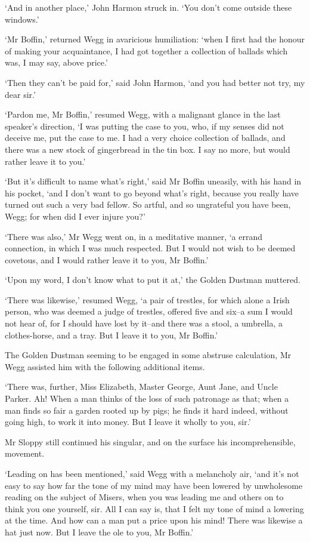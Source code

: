 ‘And in another place,’ John Harmon struck in. ‘You don’t come outside
these windows.’

‘Mr Boffin,’ returned Wegg in avaricious humiliation: ‘when I first had
the honour of making your acquaintance, I had got together a collection
of ballads which was, I may say, above price.’

‘Then they can’t be paid for,’ said John Harmon, ‘and you had better not
try, my dear sir.’

‘Pardon me, Mr Boffin,’ resumed Wegg, with a malignant glance in the
last speaker’s direction, ‘I was putting the case to you, who, if my
senses did not deceive me, put the case to me. I had a very choice
collection of ballads, and there was a new stock of gingerbread in the
tin box. I say no more, but would rather leave it to you.’

‘But it’s difficult to name what’s right,’ said Mr Boffin uneasily, with
his hand in his pocket, ‘and I don’t want to go beyond what’s right,
because you really have turned out such a very bad fellow. So artful,
and so ungrateful you have been, Wegg; for when did I ever injure you?’

‘There was also,’ Mr Wegg went on, in a meditative manner, ‘a errand
connection, in which I was much respected. But I would not wish to be
deemed covetous, and I would rather leave it to you, Mr Boffin.’

‘Upon my word, I don’t know what to put it at,’ the Golden Dustman
muttered.

‘There was likewise,’ resumed Wegg, ‘a pair of trestles, for which alone
a Irish person, who was deemed a judge of trestles, offered five and
six--a sum I would not hear of, for I should have lost by it--and there
was a stool, a umbrella, a clothes-horse, and a tray. But I leave it to
you, Mr Boffin.’

The Golden Dustman seeming to be engaged in some abstruse calculation,
Mr Wegg assisted him with the following additional items.

‘There was, further, Miss Elizabeth, Master George, Aunt Jane, and Uncle
Parker. Ah! When a man thinks of the loss of such patronage as that;
when a man finds so fair a garden rooted up by pigs; he finds it hard
indeed, without going high, to work it into money. But I leave it wholly
to you, sir.’

Mr Sloppy still continued his singular, and on the surface his
incomprehensible, movement.

‘Leading on has been mentioned,’ said Wegg with a melancholy air, ‘and
it’s not easy to say how far the tone of my mind may have been lowered
by unwholesome reading on the subject of Misers, when you was leading me
and others on to think you one yourself, sir. All I can say is, that
I felt my tone of mind a lowering at the time. And how can a man put a
price upon his mind! There was likewise a hat just now. But I leave the
ole to you, Mr Boffin.’


